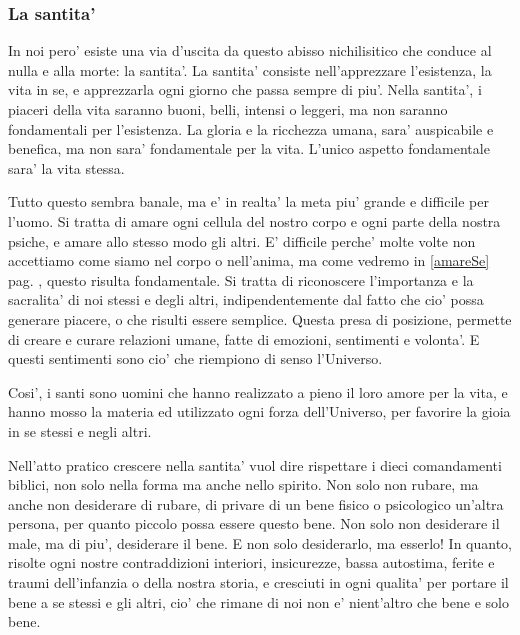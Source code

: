 \subsubsection{La santita'}

In noi pero' esiste una via d'uscita da questo abisso nichilisitico che conduce al nulla e alla morte: la santita'.
La santita' consiste nell'apprezzare l'esistenza, la vita in se, e apprezzarla ogni giorno che passa sempre di piu'. Nella santita', i piaceri della vita saranno buoni, belli, intensi o leggeri, ma non saranno fondamentali per l'esistenza. La gloria e la ricchezza umana, sara' auspicabile e benefica, ma non sara' fondamentale per la vita. L'unico aspetto fondamentale sara' la vita stessa.

Tutto questo sembra banale, ma e' in realta' la meta piu' grande e difficile per l'uomo. Si tratta di amare ogni cellula del nostro corpo e ogni parte della nostra psiche, e amare allo stesso modo gli altri. E' difficile perche' molte volte non accettiamo come siamo nel corpo o nell'anima, ma come vedremo in \ref{amareSe} pag. \pageref{amareSe}, questo risulta fondamentale. Si tratta di riconoscere l'importanza e la sacralita' di noi stessi e degli altri, indipendentemente dal fatto che cio' possa generare piacere, o che risulti essere semplice. 
Questa presa di posizione, permette di creare e curare relazioni umane, fatte di emozioni, sentimenti e volonta'. E questi sentimenti sono cio' che riempiono di senso l'Universo.

Cosi', i santi sono uomini che hanno realizzato a pieno il loro amore per la vita, e hanno mosso la materia ed utilizzato ogni forza dell'Universo, per favorire la gioia in se stessi e negli altri.

Nell'atto pratico crescere nella santita' vuol dire rispettare i dieci comandamenti biblici, non solo nella forma ma anche nello spirito. Non solo non rubare, ma anche non desiderare di rubare, di privare di un bene fisico o psicologico un'altra persona, per quanto piccolo possa essere questo bene. Non solo non desiderare il male, ma di piu', desiderare il bene. E non solo desiderarlo, ma esserlo! In quanto, risolte ogni nostre contraddizioni interiori, insicurezze, bassa autostima, ferite e traumi dell'infanzia o della nostra storia, e cresciuti in ogni qualita' per portare il bene a se stessi e gli altri, cio' che rimane di noi non e' nient'altro che bene e solo bene.

